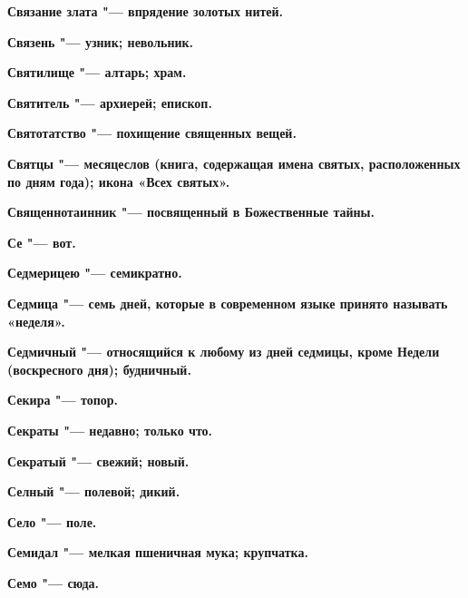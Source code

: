 \begin{multicols}{2}
\bfseries Связание злата\normalfont{} "--- впрядение золотых нитей. 




\bfseries Связень\normalfont{} "--- узник; невольник. 




\bfseries Святилище\normalfont{} "--- алтарь; храм. 




\bfseries Святитель\normalfont{} "--- архиерей; епископ. 




\bfseries Святотатство\normalfont{} "--- похищение священных вещей. 




\bfseries Святцы\normalfont{} "--- месяцеслов (книга, содержащая имена святых, расположенных по дням года); икона «Всех святых». 




\bfseries Священнотаинник\normalfont{} "--- посвященный в Божественные тайны. 




\bfseries Се\normalfont{} "--- вот. 




\bfseries Седмерицею\normalfont{} "--- семикратно. 




\bfseries Седмица\normalfont{} "--- семь дней, которые в современном языке принято называть «неделя». 




\bfseries Седмичный\normalfont{} "--- относящийся к любому из дней седмицы, кроме Недели (воскресного дня); будничный. 




\bfseries Секира\normalfont{} "--- топор. 




\bfseries Секраты\normalfont{} "--- недавно; только что. 




\bfseries Секратый\normalfont{} "--- свежий; новый. 




\bfseries Селный\normalfont{} "--- полевой; дикий. 




\bfseries Село\normalfont{} "--- поле. 




\bfseries Семидал\normalfont{} "--- мелкая пшеничная мука; крупчатка. 




\bfseries Семо\normalfont{} "--- сюда. 





\end{multicols}
